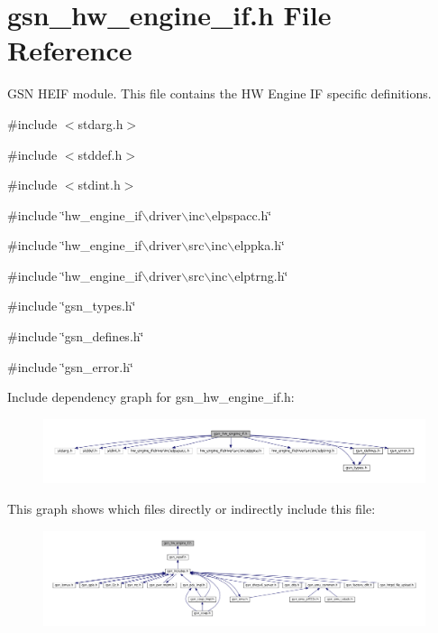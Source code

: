 \hypertarget{a00515}{
\section{gsn\_\-hw\_\-engine\_\-if.h File Reference}
\label{a00515}
}


GSN HEIF module. This file contains the HW Engine IF specific definitions.  


{\ttfamily \#include $<$stdarg.h$>$}\par
{\ttfamily \#include $<$stddef.h$>$}\par
{\ttfamily \#include $<$stdint.h$>$}\par
{\ttfamily \#include \char`\"{}hw\_\-engine\_\-if$\backslash$driver$\backslash$inc$\backslash$elpspacc.h\char`\"{}}\par
{\ttfamily \#include \char`\"{}hw\_\-engine\_\-if$\backslash$driver$\backslash$src$\backslash$inc$\backslash$elppka.h\char`\"{}}\par
{\ttfamily \#include \char`\"{}hw\_\-engine\_\-if$\backslash$driver$\backslash$src$\backslash$inc$\backslash$elptrng.h\char`\"{}}\par
{\ttfamily \#include \char`\"{}gsn\_\-types.h\char`\"{}}\par
{\ttfamily \#include \char`\"{}gsn\_\-defines.h\char`\"{}}\par
{\ttfamily \#include \char`\"{}gsn\_\-error.h\char`\"{}}\par
Include dependency graph for gsn\_\-hw\_\-engine\_\-if.h:
\nopagebreak
\begin{figure}[H]
\begin{center}
\leavevmode
\includegraphics[width=400pt]{a00747}
\end{center}
\end{figure}
This graph shows which files directly or indirectly include this file:
\nopagebreak
\begin{figure}[H]
\begin{center}
\leavevmode
\includegraphics[width=400pt]{a00748}
\end{center}
\end{figure}
